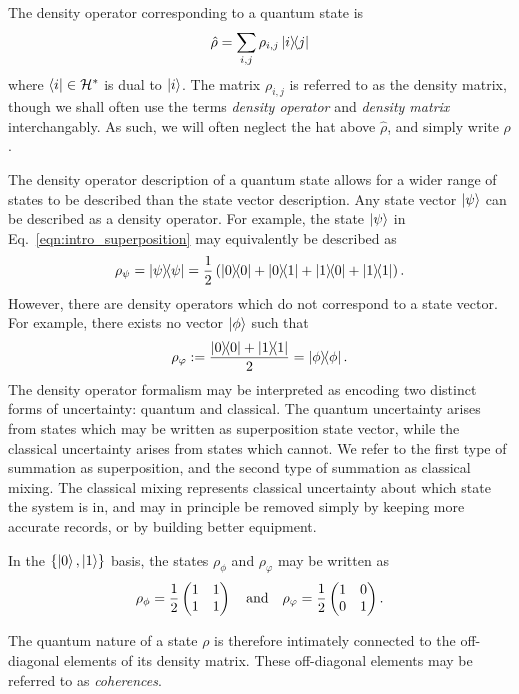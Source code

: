 The density operator corresponding to a quantum state is
\begin{equation}
\hat{\rho} = \sum_{i, j} \rho_{i, j} \dyad{i}{j}
\end{equation}
where $\bra{i} \in \mathcal{H}^*$ is dual to $\ket{i}$. The matrix $\rho_{i, j}$ is referred to as the density matrix, though we shall often use the terms \emph{density operator} and \emph{density matrix} interchangably. As such, we will often neglect the hat above $\hat{\rho}$, and simply write $\rho$.

The density operator description of a quantum state allows for a wider range of states to be described than the state vector description. Any state vector $\ket{\psi}$ can be described as a density operator. For example, the state $\ket{\psi}$ in Eq.~\ref{eqn:intro_superposition} may equivalently be described as 
\begin{equation}
\rho_\psi = \dyad{\psi}{\psi} = \frac{1}{2} \left(\dyad{0}{0} + \dyad{0}{1} + \dyad{1}{0} + \dyad{1}{1} \right).
\end{equation}
However, there are density operators which do not correspond to a state vector. For example, there exists no vector $\ket{\phi}$ such that
\begin{equation}
\rho_{\varphi} := \frac{\dyad{0}{0} + \dyad{1}{1}}{2} = \dyad{\phi}.
\end{equation}
The density operator formalism may be interpreted as encoding two distinct forms of uncertainty: quantum and classical. The quantum uncertainty arises from states which may be written as superposition state vector, while the classical uncertainty arises from states which cannot. We refer to the first type of summation as superposition, and the second type of summation as classical mixing. The classical mixing represents classical uncertainty about which state the system is in, and may in principle be removed simply by keeping more accurate records, or by building better equipment.

In the $\left\{\ket{0}, \ket{1}\right\}$ basis, the states $\rho_\phi$ and $\rho_\varphi$ may be written as
\begin{equation}
\rho_\phi = \frac{1}{2}\pmqty{1 & 1 \\ 1 & 1} \qq{and} \rho_\varphi = \frac{1}{2}\pmqty{1 & 0 \\ 0  & 1}.
\end{equation}

\noindent The quantum nature of a state $\rho$ is therefore intimately connected to the off-diagonal elements of its density matrix. These off-diagonal elements may be referred to as \emph{coherences}. 

